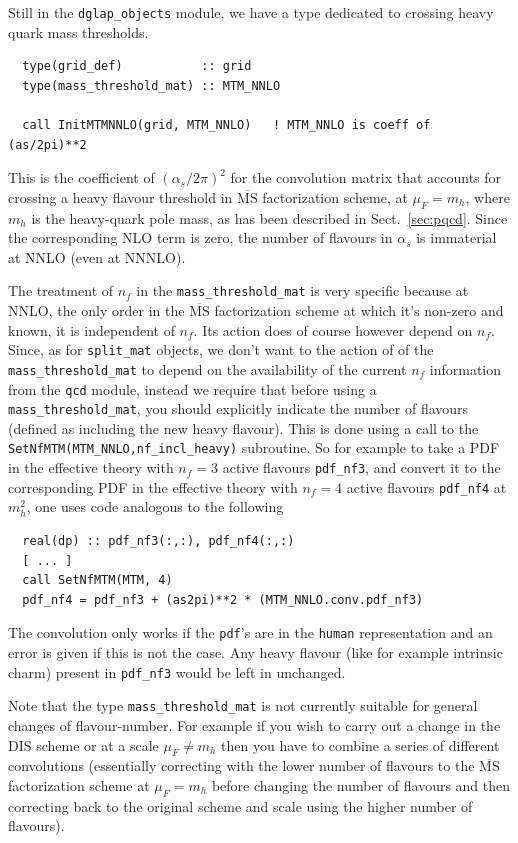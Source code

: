 \documentclass[12pt]{article}
\newcommand{\as}{\alpha_s}
\newcommand{\MSbar}{\overline{\mathrm{MS}}}
\newcommand{\ttt}[1]{\texttt{#1}}
\begin{document}
Still in the \ttt{dglap\_objects} module, we have a type dedicated to
crossing heavy quark mass thresholds.
\begin{lstlisting}
  type(grid_def)           :: grid
  type(mass_threshold_mat) :: MTM_NNLO

  call InitMTMNNLO(grid, MTM_NNLO)   ! MTM_NNLO is coeff of (as/2pi)**2
\end{lstlisting}
This is the coefficient  of $(\as/2\pi)^2$ for the convolution matrix that
accounts for crossing a heavy flavour threshold in $\MSbar$
factorization scheme, at $\mu_F = m_h$, where
$m_h$ is the heavy-quark pole mass, as has
been described in Sect.~\ref{sec:pqcd}. Since the
corresponding NLO term is zero, the number of flavours in $\as$ is
immaterial at NNLO (even at NNNLO).

The treatment of $n_f$ in the \ttt{mass\_threshold\_mat} is very
specific because at NNLO, the only order in the $\MSbar$ factorization
scheme at which it's non-zero and known, it is independent of $n_f$.
Its action does of course however depend on $n_f$. Since, as for
\ttt{split\_mat} objects, we don't want to the action of of the
\ttt{mass\_threshold\_mat} to depend on the availability of the
current $n_f$ information from the \ttt{qcd} module, instead we
require that before using a \ttt{mass\_threshold\_mat}, you should
explicitly indicate the number of flavours (defined as including the
new heavy flavour). This is done using a call to the
\ttt{SetNfMTM(MTM\_NNLO,nf\_incl\_heavy)} subroutine. So for example
to take a PDF in the effective theory with
$n_f=3$ active flavours \ttt{pdf\_nf3}, and convert it
to the corresponding PDF in the effective theory with
$n_f=4$ active flavours \ttt{pdf\_nf4} at $m_h^2$, one
uses code analogous to the following
\begin{lstlisting}
  real(dp) :: pdf_nf3(:,:), pdf_nf4(:,:)
  [ ... ]
  call SetNfMTM(MTM, 4)
  pdf_nf4 = pdf_nf3 + (as2pi)**2 * (MTM_NNLO.conv.pdf_nf3)
\end{lstlisting}
The convolution only works if the \ttt{pdf}'s are in the \ttt{human}
representation and an error is given if this is not the case. Any
heavy flavour (like for example intrinsic charm) 
present in \ttt{pdf\_nf3} would be left in unchanged.

Note that the type {\tt mass\_threshold\_mat}
is not currently suitable for general changes of
flavour-number. For example if you wish to carry out a change in the
DIS scheme or at a scale $\mu_F \neq m_h$ then you have
to combine a series of different convolutions (essentially correcting
with the lower number of flavours to the $\MSbar$ factorization scheme
at $\mu_F = m_h$ before changing the number of flavours
and then correcting back to the original scheme and scale using the
higher number of flavours).
\end{document}
